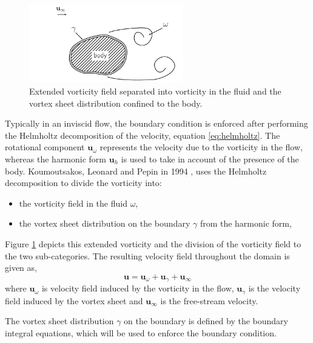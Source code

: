 	\begin{figure}[!h]
	\centering
	\includegraphics[width=0.6\textwidth]{figures/lagrangian/noSlipVorticityField.pdf}
	\caption{Extended vorticity field separated into vorticity in the fluid and the vortex sheet distribution confined to the body.}
	\label{fig:noSlipVorticityField}
	\end{figure}

Typically in an inviscid flow, the boundary condition is enforced after performing the Helmholtz decomposition of the velocity, equation \ref{eq:helmholtz}. The rotational component $\mathbf{u}_{\omega}$ represents the velocity due to the vorticity in the flow, whereas the harmonic form $\mathbf{u}_h$ is used to take in account of the presence of the body. Koumoutsakos, Leonard and Pepin in 1994 \cite{Koumoutsakos1994b}, uses the Helmholtz decomposition to divide the vorticity into: 
\begin{itemize}
\item the vorticity field in the fluid $\omega$,
\item the vortex sheet distribution on the boundary $\gamma$ from the harmonic form,
\end{itemize}
Figure \ref{fig:noSlipVorticityField} depicts this extended vorticity and the division of the vorticity field to the two sub-categories. The resulting velocity field throughout the domain is given as,
\begin{equation}
\mathbf{u} = \mathbf{u}_{\omega} + \mathbf{u}_{\gamma} + \mathbf{u}_{\infty}
\label{eq:la_noslipbcsimple}
\end{equation}
where $\mathbf{u}_{\omega}$ is velocity field induced by the vorticity in the flow, $\mathbf{u}_{\gamma}$ is the velocity field induced by the vortex sheet and $\mathbf{u}_{\infty}$ is the free-stream velocity.

The vortex sheet distribution $\gamma$ on the boundary is defined by the boundary integral equations, which will be used to enforce the boundary condition.

